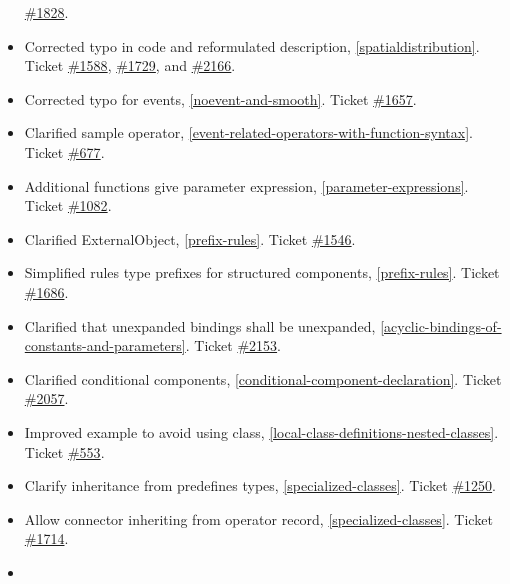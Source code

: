 \begin{itemize}
  \href{https://github.com/modelica/ModelicaSpecification/issues/1828}{\#1828}.
\item
  Corrected typo in code and reformulated description, \autoref{spatialdistribution}.
  Ticket \href{https://github.com/modelica/ModelicaSpecification/issues/1588}{\#1588},
  \href{https://github.com/modelica/ModelicaSpecification/issues/1729}{\#1729}, and
  \href{https://github.com/modelica/ModelicaSpecification/issues/2166}{\#2166}.
\item
  Corrected typo for events, \autoref{noevent-and-smooth}. Ticket
  \href{https://github.com/modelica/ModelicaSpecification/issues/1657}{\#1657}.
\item
  Clarified sample operator, \autoref{event-related-operators-with-function-syntax}. Ticket
  \href{https://github.com/modelica/ModelicaSpecification/issues/677}{\#677}.
\item
  Additional functions give parameter expression, \autoref{parameter-expressions}. Ticket
  \href{https://github.com/modelica/ModelicaSpecification/issues/1082}{\#1082}.
\item
  Clarified ExternalObject, \autoref{prefix-rules}. Ticket
  \href{https://github.com/modelica/ModelicaSpecification/issues/1546}{\#1546}.
\item
  Simplified rules type prefixes for structured components, \autoref{prefix-rules}. Ticket
  \href{https://github.com/modelica/ModelicaSpecification/issues/1686}{\#1686}.
\item
  Clarified that unexpanded bindings shall be unexpanded, \autoref{acyclic-bindings-of-constants-and-parameters}.
  Ticket \href{https://github.com/modelica/ModelicaSpecification/issues/2153}{\#2153}.
\item
  Clarified conditional components, \autoref{conditional-component-declaration}. Ticket
  \href{https://github.com/modelica/ModelicaSpecification/issues/2057}{\#2057}.
\item
  Improved example to avoid using class, \autoref{local-class-definitions-nested-classes}. Ticket
  \href{https://github.com/modelica/ModelicaSpecification/issues/553}{\#553}.
\item
  Clarify inheritance from predefines types, \autoref{specialized-classes}. Ticket
  \href{https://github.com/modelica/ModelicaSpecification/issues/1250}{\#1250}.
\item
  Allow connector inheriting from operator record, \autoref{specialized-classes}. Ticket
  \href{https://github.com/modelica/ModelicaSpecification/issues/1714}{\#1714}.
\item

\end{itemize}
